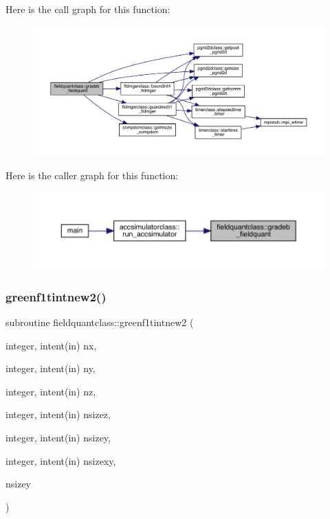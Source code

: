 Here is the call graph for this function\+:
\nopagebreak
\begin{figure}[H]
\begin{center}
\leavevmode
\includegraphics[width=350pt]{namespacefieldquantclass_a1424ab249c01287bbfe998370d2c5703_cgraph}
\end{center}
\end{figure}
Here is the caller graph for this function\+:\nopagebreak
\begin{figure}[H]
\begin{center}
\leavevmode
\includegraphics[width=350pt]{namespacefieldquantclass_a1424ab249c01287bbfe998370d2c5703_icgraph}
\end{center}
\end{figure}
\mbox{\label{namespacefieldquantclass_a32715398e47b9a73bd6cde1ae980e0a3}} 
\subsubsection{\texorpdfstring{greenf1tintnew2()}{greenf1tintnew2()}}
{\footnotesize\ttfamily subroutine fieldquantclass\+::greenf1tintnew2 (\begin{DoxyParamCaption}\item[{integer, intent(in)}]{nx,  }\item[{integer, intent(in)}]{ny,  }\item[{integer, intent(in)}]{nz,  }\item[{integer, intent(in)}]{nsizez,  }\item[{integer, intent(in)}]{nsizey,  }\item[{integer, intent(in)}]{nsizexy,  }\item[{}]{nsizey }\end{DoxyParamCaption})}



